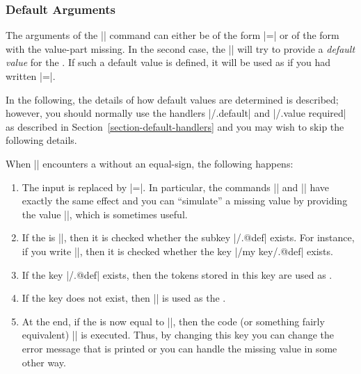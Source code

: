 \subsubsection{Default Arguments}

The arguments of the |\pgfkeys| command can either be of the form
|=| or of the form  with the value-part
missing. In the second case, the |\pgfkeys| will try to provide a \emph{default
value} for the . If such a default value is defined, it will be
used as if you had written |=|.

In the following, the details of how default values are determined is
described; however, you should normally use the handlers |/.default| and
|/.value required| as described in Section~\ref{section-default-handlers} and
you may wish to skip the following details.

When |\pgfkeys| encounters a  without an equal-sign, the following
happens:
%
\begin{enumerate}
    \item The input is replaced by |=\pgfkeysnovalue|. In particular,
        the commands || and
        || have exactly the same effect and
        you can ``simulate'' a missing value by providing the value
        |\pgfkeysnovalue|, which is sometimes useful.
    \item If the  is |\pgfkeysnovalue|, then it is checked whether
        the subkey |/.@def| exists. For instance, if you write
        ||, then it is checked whether the key |/my key/.@def|
        exists.
    \item If the key |/.@def| exists, then the tokens stored in this
        key are used as .
    \item If the key does not exist, then |\pgfkeysnovalue| is used as the
        .
    \item At the end, if the  is now equal to
        |\pgfkeysvaluerequired|, then the code (or something fairly equivalent)
        || is executed. Thus, by
        changing this key you can change the error message that is printed or
        you can handle the missing value in some other way.
\end{enumerate}


